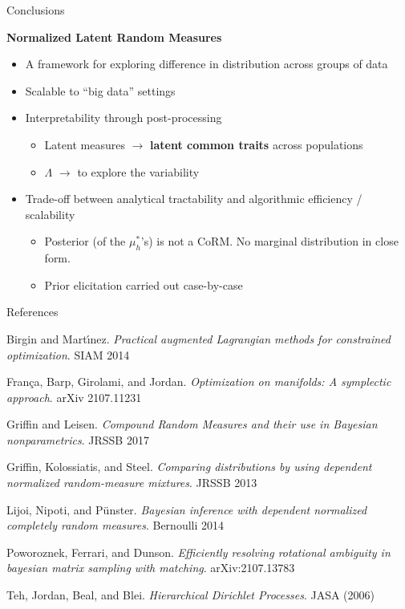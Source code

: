 \documentclass[10.5pt, aspectratio=169]{beamer} %
\begin{document}
\begin{frame}{Conclusions}

\textbf{Normalized Latent Random Measures}

\medskip

\begin{itemize}[<+->]
	\setlength{\itemsep}{1.2em}
	
	\item A framework for exploring difference in distribution across groups of data
	
	\item Scalable to ``big data'' settings
	
	\item Interpretability through post-processing
	\begin{itemize}
		\item Latent measures $\longrightarrow$ \textbf{latent common traits} across populations
		\item $\Lambda$ $\longrightarrow$  to explore the variability
	\end{itemize}
	
	\item Trade-off between analytical tractability and algorithmic efficiency / scalability
	\begin{itemize}
		\item Posterior (of the $\mu^*_h$'s) is not a CoRM. No marginal distribution in close form.
		\item Prior elicitation carried out case-by-case
	\end{itemize}
	
\end{itemize}

\end{frame}


\begin{frame}{References}

Birgin and Mart{\'\i}nez. \emph{Practical augmented Lagrangian methods for constrained optimization}. SIAM 2014

\medskip
França, Barp, Girolami, and Jordan. \emph{Optimization on manifolds: A symplectic approach}.  arXiv 2107.11231

\medskip
Griffin and Leisen. \emph{Compound Random Measures and their use in Bayesian nonparametrics}. JRSSB 2017

\medskip
Griffin, Kolossiatis, and Steel. \emph{Comparing distributions by using dependent normalized random-measure mixtures}. JRSSB 2013

\medskip
Lijoi, Nipoti, and P{\"u}nster. \emph{Bayesian inference with dependent normalized completely random measures}. Bernoulli 2014

\medskip
Poworoznek, Ferrari, and Dunson. \emph{Efficiently resolving rotational ambiguity in bayesian matrix sampling with matching}. arXiv:2107.13783

\medskip
Teh, Jordan, Beal, and Blei. \emph{Hierarchical Dirichlet Processes}. JASA (2006)

\end{frame}
\end{document}
